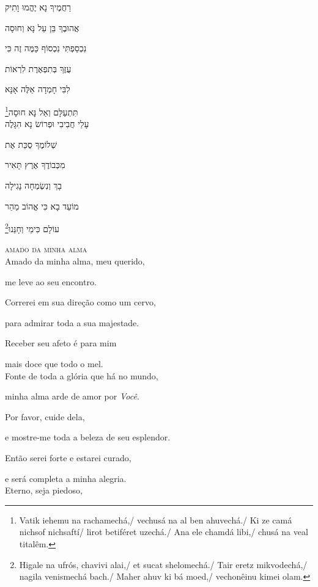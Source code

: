 רַחֲמֶיךָ נָא יֶהֱמוּ וָתִיק

אֲהוּבֶךָ בֵּן עַל נָּא וְחוּסָה

נִכְסַפְתִּי נִכְסוֹף כַּמֶּה זֶה כִּי

עֻזֶּךָ בְּתִפְאֶרֶת לִרְאוֹת

לִבִּי חָמְדָה אֵלֶּה אָנָּא

\footnote{Vatik iehemu na rachamechá,/ vechusá na al ben ahuvechá./ Ki ze camá nichsof nichsaftí/ lirot betiféret uzechá./ Ana ele chamdá libi,/ chusá na veal titalêm.}תִּתְעַלָּם וְאַל נָּא חוּסָה\\[10pt]

עָלַי חֲבִיבִי וּפְרוֹשׂ נָא הִגָּלֶה

שְׁלוֹמֶךָ סֻכַּת אֶת

מִכְּבוֹדֶךָ אֶרֶץ תָּאִיר

בָךְ וְנִשְׂמְחָה נָגִילָה

מוֹעֵד בָא כִּי אֱהוֹב מַהֵר

\footnote{Higale na ufrós, chavivi alai,/ et sucat shelomechá./ Tair eretz mikvodechá,/ nagila venismechá bach./ Maher ahuv ki bá moed,/ vechonêinu kimei olam.}עוֹלָם כִּימֵי וְחָנֵּנוּ



\movetooddpage
\raggedright

\vspace*{1cm}

\textsc{amado da minha alma}\\[15pt]

Amado da minha alma, meu querido,

me leve ao seu encontro.

Correrei em sua direção como um cervo,

para admirar toda a sua majestade.

Receber seu afeto é para mim

mais doce que todo o mel.\\[10pt]

Fonte de toda a glória que há no mundo,

minha alma arde de amor por \emph{Você}.

Por favor, cuide dela,

e mostre-me toda a beleza de seu esplendor.

Então serei forte e estarei curado,

e será completa a minha alegria.\\[10pt]

Eterno, seja piedoso,

